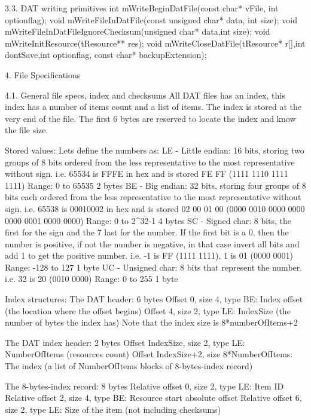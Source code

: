 3.3. DAT writing primitives
 int  mWriteBeginDatFile(const char* vFile, int optionflag);
 void mWriteFileInDatFile(const unsigned char* data, int size);
 void mWriteFileInDatFileIgnoreChecksum(unsigned char* data,int size);
 void mWriteInitResource(tResource** res);
 void mWriteCloseDatFile(tResource* r[],int dontSave,int optionflag, const char*
backupExtension);

4. File Specifications

4.1. General file specs, index and checksums
 All DAT files has an index, this index has a number of items count and
 a list of items.
 The index is stored at the very end of the file.
 The first 6 bytes are reserved to locate the index and know the file size.

 Stored values:
 Lets define the numbers as:
  LE - Little endian: 16 bits, storing two groups of 8 bits ordered from
       the less representative to the most representative without sign.
       i.e. 65534 is FFFE in hex and is stored FE FF (1111 1110 1111 1111)
       Range: 0 to 65535
       2 bytes
  BE - Big endian: 32 bits, storing four groups of 8 bits each ordered from
       the less representative to the most representative without sign.
       i.e. 65538 is 00010002 in hex and is stored 02 00 01 00
       (0000 0010 0000 0000 0000 0001 0000 0000)
       Range: 0 to 2^32-1
       4 bytes
  SC - Signed char: 8 bits, the first for the sign and the 7 last for the
       number. If the first bit is a 0, then the number is positive, if not
       the number is negative, in that case invert all bits and add 1 to
       get the positive number.
       i.e. -1 is FF (1111 1111), 1 is 01 (0000 0001)
       Range: -128 to 127
       1 byte
  UC - Unsigned char: 8 bits that represent the number.
       i.e. 32 is 20 (0010 0000)
       Range: 0 to 255
       1 byte

 Index structures:
 The DAT header: 6 bytes
  Offset 0, size 4, type BE: Index offset (the location where the offset
                             begins)
  Offset 4, size 2, type LE: IndexSize (the number of bytes the index has)
                             Note that the index size is 8*numberOfItems+2

 The DAT index header: 2 bytes
  Offset IndexSize, size 2, type LE: NumberOfItems (resources count)
  Offset IndexSize+2, size 8*NumberOfItems: The index (a list of
                              NumberOfItems blocks of 8-bytes-index record)

 The 8-bytes-index record: 8 bytes
  Relative offset 0, size 2, type LE: Item ID
  Relative offset 2, size 4, type BE: Resource start absolute offset
  Relative offset 6, size 2, type LE: Size of the item (not including
                                      checksums)

